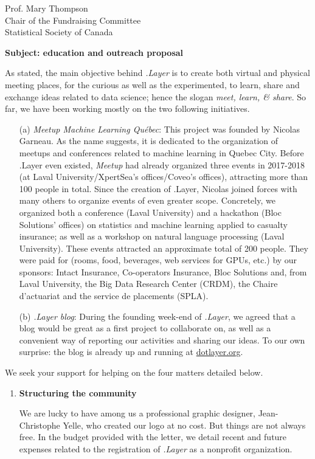 \documentclass[11pt, a4paper]{letter} %
\begin{document}
\begin{letter}{
	Prof. Mary Thompson\\
	Chair of the Fundraising Committee\\
	Statistical Society of Canada
	
	\bigskip
	\textbf{Subject: education and outreach proposal}%
}
As stated, the main objective behind \emph{.Layer} is to create both virtual and physical meeting places, for the curious as well as the experimented, to learn, share and exchange ideas related to data science; hence the slogan \emph{meet, learn, \& share}. So far, we have been working mostly on the two following initiatives.
\begin{enumerate}
	\item[(a)] \emph{Meetup Machine Learning Québec}: This project was founded by Nicolas Garneau. As the name suggests, it is dedicated to the organization of meetups and conferences related to machine learning in Quebec City. Before .Layer even existed, \emph{Meetup} had already organized three events in 2017-2018 (at Laval University/XpertSea's offices/Coveo's offices), attracting more than 100 people in total. Since the creation of .Layer, Nicolas joined forces with many others to organize events of even greater scope. Concretely, we organized both a conference (Laval University) and a hackathon (Bloc Solutions' offices) on statistics and machine learning applied to casualty insurance; as well as a workshop on natural language processing (Laval University). These events attracted an approximate total of 200 people. They were paid for (rooms, food, beverages, web services for GPUs, etc.) by our sponsors: Intact Insurance, Co-operators Insurance, Bloc Solutions and, from Laval University, the Big Data Research Center (CRDM), the Chaire d'actuariat and the service de placements (SPLA).
	\item[(b)] \emph{.Layer blog}: During the founding week-end of \emph{.Layer}, we agreed that a blog would be great as a first project to collaborate on, as well as a convenient way of reporting our activities and sharing our ideas. To our own surprise: the blog is already up and running at \href{https://www.dotlayer.org/}{dotlayer.org}.
\end{enumerate}

We seek your support for helping on the four matters detailed below.

\begin{enumerate}
	\item \textbf{Structuring the community}
	
	\quad We are lucky to have among us a professional graphic designer, Jean-Christophe Yelle, who created our logo at no cost. But things are not always free. In the budget provided with the letter, we detail recent and future expenses related to the registration of \emph{.Layer} as a nonprofit organization.
	

\end{enumerate}
\end{letter}
\end{document}
